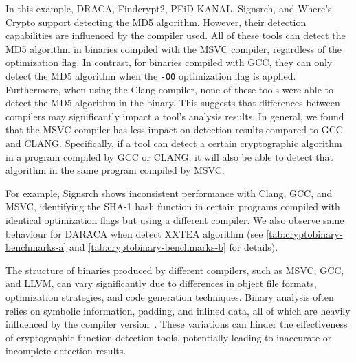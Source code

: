 In this example, DRACA, Findcrypt2, PEiD KANAL, Signsrch, and Where's Crypto support detecting the MD5 algorithm. However, their detection capabilities are influenced by the compiler used. All of these tools can detect the MD5 algorithm in binaries compiled with the MSVC compiler, regardless of the optimization flag. In contrast, for binaries compiled with GCC, they can only detect the MD5 algorithm when the \texttt{-O0} optimization flag is applied. Furthermore, when using the Clang compiler, none of these tools were able to detect the MD5 algorithm in the binary. This suggests that differences between compilers may significantly impact a tool's analysis results. In general, we found that the MSVC compiler has less impact on detection results compared to GCC and CLANG. Specifically, if a tool can detect a certain cryptographic algorithm in a program compiled by GCC or CLANG, it will also be able to detect that algorithm in the same program compiled by MSVC.

For example, Signsrch shows inconsistent performance with Clang, GCC, and MSVC, identifying the SHA-1 hash function in certain programs compiled with identical optimization flags but using a different compiler. We also observe same behaviour for DARACA when detect XXTEA algorithm (see \autoref{tab:cryptobinary-benchmarks-a} and \autoref{tab:cryptobinary-benchmarks-b} for details).

The structure of binaries produced by different compilers, such as MSVC, GCC, and LLVM, can vary significantly due to differences in object file formats, optimization strategies, and code generation techniques. Binary analysis often relies on symbolic information, padding, and inlined data, all of which are heavily influenced by the compiler version~\cite{andriesse2017compiler}. These variations can hinder the effectiveness of cryptographic function detection tools, potentially leading to inaccurate or incomplete detection results.


